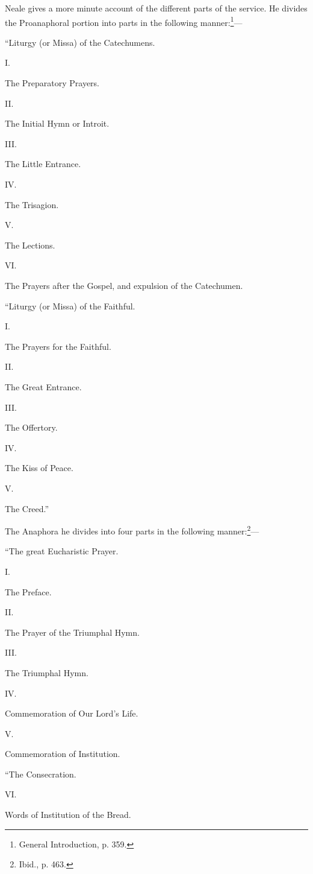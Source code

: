Neale gives a more minute account of the different parts of the service. He divides the Proanaphoral portion into parts in the following manner:\footnote{\par  General Introduction, p. 359.}—

“Liturgy (or Missa) of the Catechumens.

I.

The Preparatory Prayers.

II.

The Initial Hymn or Introit.

III.

The Little Entrance.

IV.

The Trisagion.

V.

The Lections.

VI.

The Prayers after the Gospel, and expulsion of the Catechumen.

“Liturgy (or Missa) of the Faithful.

I.

The Prayers for the Faithful.

II.

The Great Entrance.

III.

The Offertory.

IV.

The Kiss of Peace.

V.

The Creed.”

The Anaphora he divides into four parts in the following manner:\footnote{\par  Ibid., p. 463.}—

“The great Eucharistic Prayer.

I.

The Preface.

II.

The Prayer of the Triumphal Hymn.

III.

The Triumphal Hymn.

IV.

Commemoration of Our Lord’s Life.

V.

Commemoration of Institution.

“The Consecration.

VI.

Words of Institution of the Bread.


